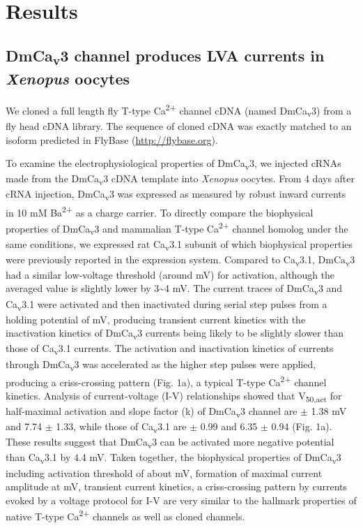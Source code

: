 \section*{Results}

\subsection*{DmCa\textsubscript{v}3 channel produces LVA currents in \emph{Xenopus} oocytes}

We cloned a full length fly T-type Ca\textsuperscript{2+} channel cDNA (named DmCa\textsubscript{v}3) from a fly head cDNA library. 
The sequence of cloned cDNA was exactly matched to an isoform predicted in FlyBase (\href{http://}{http://flybase.org}). 

To examine the electrophysiological properties of DmCa\textsubscript{v}3, we injected cRNAs made from the DmCa\textsubscript{v}3 cDNA template into \emph{Xenopus} oocytes.
From 4 days after cRNA injection, DmCa\textsubscript{v}3 was expressed as measured by robust inward currents in 10 mM Ba\textsuperscript{2+} as a charge carrier.
To directly compare the biophysical properties of DmCa\textsubscript{v}3 and mammalian T-type Ca\textsuperscript{2+} channel homolog under the same conditions, we expressed rat Ca\textsubscript{v}3.1 subunit of which biophysical properties were previously reported in the expression system\cite{9495342}.
Compared to Ca\textsubscript{v}3.1, DmCa\textsubscript{v}3 had a similar low-voltage threshold (around  mV) for activation, although the averaged value is slightly lower by 3\sim 4 mV.
The current traces of DmCa\textsubscript{v}3 and Ca\textsubscript{v}3.1 were activated and then inactivated during serial step pulses from a holding potential of  mV, producing transient current kinetics with the inactivation kinetics of DmCa\textsubscript{v}3 currents being likely to be slightly slower than those of Ca\textsubscript{v}3.1 currents.
The activation and inactivation kinetics of currents through DmCa\textsubscript{v}3 was accelerated as the higher step pulses were applied, producing a criss-crossing pattern (Fig. 1a), a typical T-type Ca\textsuperscript{2+} channel kinetics.
Analysis of current-voltage (I-V) relationships showed that V\textsubscript{50,act} for half-maximal activation and slope factor (k) of DmCa\textsubscript{v}3 channel are  $\pm$ 1.38 mV and 7.74 $\pm$ 1.33, while those of Ca\textsubscript{v}3.1 are  $\pm$ 0.99 and 6.35 $\pm$ 0.94 (Fig. 1a).
These results suggest that DmCa\textsubscript{v}3 can be activated more negative potential than Ca\textsubscript{v}3.1 by 4.4 mV.
Taken together, the biophysical properties of DmCa\textsubscript{v}3 including activation threshold of about  mV, formation of maximal current amplitude at  mV, transient current kinetics, a criss-crossing pattern by currents evoked by a voltage protocol for I-V are very similar to the hallmark properties of native T-type Ca\textsuperscript{2+} channels as well as cloned channels\cite{9495342, 6087159, 9670923, 10066244}.

